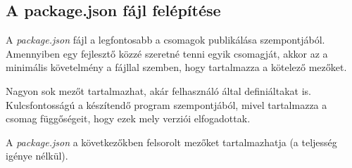 \begin{flushright}
	\cite{npm-packages}
\end{flushright}

	\subsection{A package.json fájl felépítése}
	
	A \emph{package.json} fájl a legfontosabb a csomagok publikálása szempontjából. Amennyiben egy fejlesztő közzé szeretné tenni egyik csomagját, akkor az a minimális követelmény a fájllal szemben, hogy tartalmazza a kötelező mezőket.
	
	Nagyon sok mezőt tartalmazhat, akár felhasználó által definiáltakat is. Kulcsfontosságú a készítendő program szempontjából, mivel tartalmazza a csomag függőségeit, hogy ezek mely verziói elfogadottak.
	
	A \emph{package.json} a következőkben felsorolt mezőket tartalmazhatja (a teljesség igénye nélkül). \cite{npm-package.json}
	
